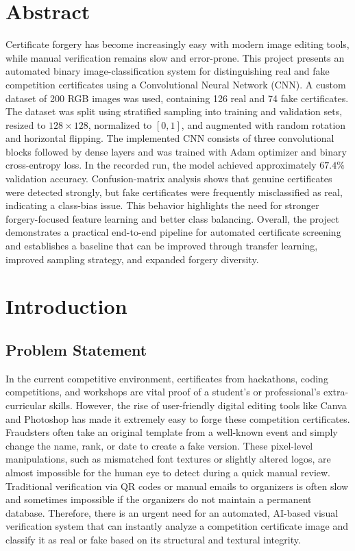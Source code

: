\documentclass[12pt,a4paper]{article}
\begin{document}
\section*{Abstract}
Certificate forgery has become increasingly easy with modern image editing tools, while manual verification remains slow and error-prone. This project presents an automated binary image-classification system for distinguishing real and fake competition certificates using a Convolutional Neural Network (CNN). A custom dataset of 200 RGB images was used, containing 126 real and 74 fake certificates. The dataset was split using stratified sampling into training and validation sets, resized to $128 \times 128$, normalized to $[0,1]$, and augmented with random rotation and horizontal flipping. The implemented CNN consists of three convolutional blocks followed by dense layers and was trained with Adam optimizer and binary cross-entropy loss. In the recorded run, the model achieved approximately $67.4\%$ validation accuracy. Confusion-matrix analysis shows that genuine certificates were detected strongly, but fake certificates were frequently misclassified as real, indicating a class-bias issue. This behavior highlights the need for stronger forgery-focused feature learning and better class balancing. Overall, the project demonstrates a practical end-to-end pipeline for automated certificate screening and establishes a baseline that can be improved through transfer learning, improved sampling strategy, and expanded forgery diversity.

\newpage
\tableofcontents
\newpage

\section{Introduction}
\subsection{Problem Statement}
In the current competitive environment, certificates from hackathons, coding competitions, and workshops are vital proof of a student's or professional's extra-curricular skills. However, the rise of user-friendly digital editing tools like Canva and Photoshop has made it extremely easy to forge these competition certificates. Fraudsters often take an original template from a well-known event and simply change the name, rank, or date to create a fake version. These pixel-level manipulations, such as mismatched font textures or slightly altered logos, are almost impossible for the human eye to detect during a quick manual review. Traditional verification via QR codes or manual emails to organizers is often slow and sometimes impossible if the organizers do not maintain a permanent database. Therefore, there is an urgent need for an automated, AI-based visual verification system that can instantly analyze a competition certificate image and classify it as real or fake based on its structural and textural integrity.
\end{document}
